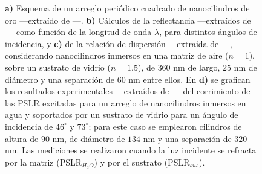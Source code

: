 \begin{figure}[h!]
		\caption{\textbf{a)} Esquema de  un arreglo periódico cuadrado de nanocilindros de oro ---extraído de  \cite{kabashin2009plasmonic}---. \textbf{b)} Cálculos de la reflectancia ---extraídos de  \cite{kabashin2009plasmonic}--- como función de la longitud de onda $\lambda$, para distintos ángulos de incidencia, y \textbf{c)} de la relación de dispersión ---extraída de  \cite{kabashin2009plasmonic}---, considerando nanocilindros inmersos en una matriz de aire ($n=1$), sobre un sustrato de vidrio ($n=1.5$), de $360$ nm de largo, $25$ nm de diámetro y una separación de $60$ nm entre ellos. En \textbf{d)} se grafican los resultados experimentales ---extraídos de  \cite{danilov2018ultra}--- del corrimiento de las PSLR excitadas para un arreglo de nanocilindros inmersos en agua y soportados por un sustrato de vidrio para un ángulo de incidencia de $46^\circ$ y $73^\circ$; para este caso se emplearon cilindros de altura de $90$ nm, de diámetro de $134$ nm y una separación de $320$ nm. Las mediciones se realizaron cuando la luz incidente se refracta por la matriz (PSLR$_{H_2{O}}$) y por el sustrato (PSLR$_{sus}$).}\label{fig:GraphsPapersNANOCILINDROS}
	\end{figure}

